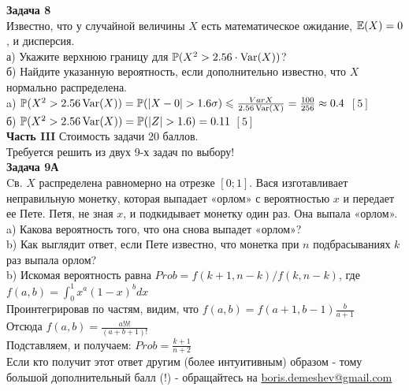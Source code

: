 \documentclass[12pt, a4paper]{article}\usepackage[]{graphicx}\usepackage[]{color}
\begin{document}
\textbf{Задача 8} \\ %
Известно, что у случайной величины $X$ есть
математическое
ожидание, $\mathbb{E}(X)=0$, и дисперсия. \\
а) Укажите верхнюю границу для $\mathbb{P}(X^{2}>2.56\cdot \operatorname{Var}(X))$? \\%
б) Найдите указанную вероятность, если дополнительно известно, что
$X$ нормально распределена. \\%
a) $\P(X^{2}>2.56\Var(X))=\P(|X-0|>1.6\sigma)\le
\frac{Var{X}}{2.56\Var(X)}=\frac{100}{256}\approx 0.4$ $[5]$\\
б) $\P(X^{2}>2.56\Var(X))=\P(|Z|>1.6)=0.11$ $[5]$\\

\textbf{Часть III} Стоимость задачи 20 баллов. \\
Требуется решить \textbf{} из двух 9-х задач по
выбору! \\

\textbf{Задача 9А} \\
Cв.  $X$ распределена равномерно на отрезке $[0;1]$. Вася изготавливает неправильную монетку, которая выпадает «орлом» с вероятностью  $x$ и передает ее Пете.
Петя, не зная $x$, и подкидывает монетку один раз. Она выпала
«орлом». \\
a) Какова вероятность того, что она снова выпадет
«орлом»? \\
b) Как выглядит ответ, если Пете известно, что монетка при
$n$ подбрасываниях  $k$  раз выпала орлом? \\

b) Искомая вероятность равна $Prob=f(k+1,n-k)/f(k,n-k)$, где \\
$f(a,b)=\int_{0}^{1}x^{a}(1-x)^{b}dx$ \\
Проинтегрировав по частям, видим, что $f(a,b)=f(a+1,b-1)\frac{b}{a+1}$ \\
Отсюда $f(a,b)=\frac{a!b!}{(a+b+1)!}$ \\
Подставляем, и получаем: $Prob=\frac{k+1}{n+2}$ \\
Если кто получит этот ответ другим (более интуитивным) образом - тому большой дополнительный балл (!) - обращайтесь на \href{mailto:boris.demeshev@gmail.com}{boris.demeshev@gmail.com} \\
\end{document}
